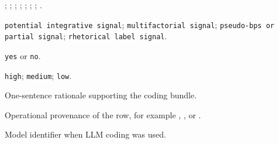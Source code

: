 \documentclass[11pt]{article}
\begin{document}
\begin{description}
\item[] ; ; ; ; ; ; ; .
\item[] \texttt{potential integrative signal}; \texttt{multifactorial signal}; \texttt{pseudo-bps or partial signal}; \texttt{rhetorical label signal}.
\item[] \texttt{yes} or \texttt{no}.
\item[] \texttt{high}; \texttt{medium}; \texttt{low}.
\item[] One-sentence rationale supporting the coding bundle.
\item[] Operational provenance of the row, for example , , or .
\item[] Model identifier when LLM coding was used.
\end{description}
\end{document}
